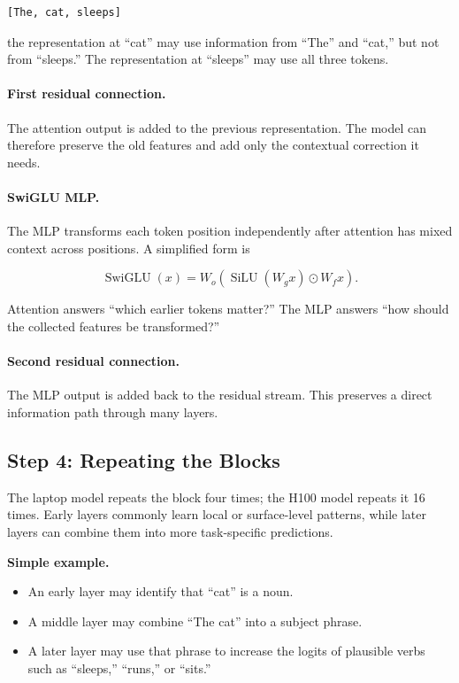 \documentclass[11pt,a4paper]{article}
\begin{document}
\begin{lstlisting}
[The, cat, sleeps]
\end{lstlisting}

the representation at ``cat'' may use information from ``The'' and ``cat,'' but
not from ``sleeps.'' The representation at ``sleeps'' may use all three tokens.

\paragraph{First residual connection.}
The attention output is added to the previous representation. The model can
therefore preserve the old features and add only the contextual correction it
needs.

\paragraph{SwiGLU MLP.}
The MLP transforms each token position independently after attention has mixed
context across positions. A simplified form is

\begin{equation}
  \operatorname{SwiGLU}(x)
  =W_o\left(\operatorname{SiLU}(W_gx)\odot W_fx\right).
\end{equation}

Attention answers ``which earlier tokens matter?'' The MLP answers ``how should
the collected features be transformed?''

\paragraph{Second residual connection.}
The MLP output is added back to the residual stream. This preserves a direct
information path through many layers.

\subsection{Step 4: Repeating the Blocks}

The laptop model repeats the block four times; the H100 model repeats it 16
times. Early layers commonly learn local or surface-level patterns, while later
layers can combine them into more task-specific predictions.

\textbf{Simple example.}

\begin{itemize}
  \item An early layer may identify that ``cat'' is a noun.
  \item A middle layer may combine ``The cat'' into a subject phrase.
  \item A later layer may use that phrase to increase the logits of plausible
        verbs such as ``sleeps,'' ``runs,'' or ``sits.''
\end{itemize}
\end{document}
